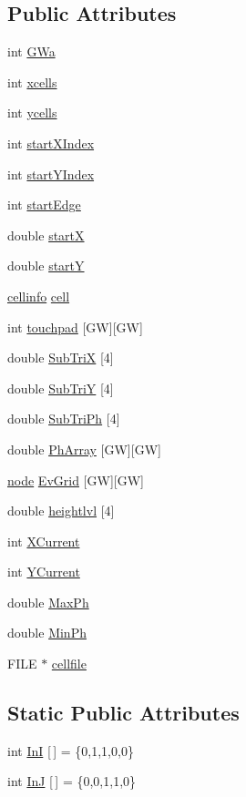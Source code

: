 \subsection*{Public Attributes}
\begin{CompactItemize}
\item 
int \hyperlink{classContour_o0}{GWa}
\item 
int \hyperlink{classContour_o1}{xcells}
\item 
int \hyperlink{classContour_o2}{ycells}
\item 
int \hyperlink{classContour_o3}{start\-XIndex}
\item 
int \hyperlink{classContour_o4}{start\-YIndex}
\item 
int \hyperlink{classContour_o5}{start\-Edge}
\item 
double \hyperlink{classContour_o6}{start\-X}
\item 
double \hyperlink{classContour_o7}{start\-Y}
\item 
\hyperlink{structcellinfo}{cellinfo} \hyperlink{classContour_o8}{cell}
\item 
int \hyperlink{classContour_o9}{touchpad} \mbox{[}GW\mbox{]}\mbox{[}GW\mbox{]}
\item 
double \hyperlink{classContour_o10}{Sub\-Tri\-X} \mbox{[}4\mbox{]}
\item 
double \hyperlink{classContour_o11}{Sub\-Tri\-Y} \mbox{[}4\mbox{]}
\item 
double \hyperlink{classContour_o12}{Sub\-Tri\-Ph} \mbox{[}4\mbox{]}
\item 
double \hyperlink{classContour_o13}{Ph\-Array} \mbox{[}GW\mbox{]}\mbox{[}GW\mbox{]}
\item 
\hyperlink{structnode}{node} \hyperlink{classContour_o14}{Ev\-Grid} \mbox{[}GW\mbox{]}\mbox{[}GW\mbox{]}
\item 
double \hyperlink{classContour_o15}{heightlvl} \mbox{[}4\mbox{]}
\item 
int \hyperlink{classContour_o16}{XCurrent}
\item 
int \hyperlink{classContour_o17}{YCurrent}
\item 
double \hyperlink{classContour_o18}{Max\-Ph}
\item 
double \hyperlink{classContour_o19}{Min\-Ph}
\item 
FILE $\ast$ \hyperlink{classContour_o20}{cellfile}
\end{CompactItemize}
\subsection*{Static Public Attributes}
\begin{CompactItemize}
\item 
int \hyperlink{classContour_s0}{In\-I} \mbox{[}$\,$\mbox{]} = \{0,1,1,0,0\}
\item 
int \hyperlink{classContour_s1}{In\-J} \mbox{[}$\,$\mbox{]} = \{0,0,1,1,0\}
\end{CompactItemize}


